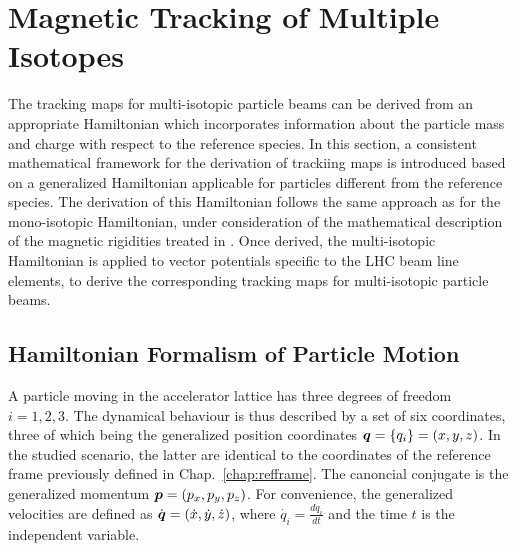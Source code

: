 \section{Magnetic Tracking of Multiple Isotopes}
%
The tracking maps for multi-isotopic particle beams can be derived from an appropriate Hamiltonian which incorporates information about the particle mass and charge with respect to the reference species. In this section, a consistent mathematical framework for the derivation of trackiing maps is introduced based on a  generalized Hamiltonian applicable for particles different from the reference species. The derivation of this Hamiltonian follows the same approach as for the mono-isotopic Hamiltonian, under consideration of the mathematical description of the magnetic rigidities treated in \chapref{}. Once derived, the multi-isotopic Hamiltonian is applied to vector potentials specific to the LHC beam line elements, to derive the corresponding tracking maps for multi-isotopic particle beams.
%
\subsection{Hamiltonian Formalism of Particle Motion} \label{chap:hamiltonian}


A particle moving in the accelerator lattice has three degrees of freedom $i=1,2,3$. The dynamical behaviour is thus described by a set of six coordinates, three of which being the generalized position coordinates $\boldsymbol{q} = \{q_i\} = (x,y,z)$. In the studied scenario, the latter are identical to the coordinates of the reference frame previously defined in Chap.~\ref{chap:refframe}. The canoncial conjugate is the generalized momentum $\boldsymbol{p} = (p_x,p_y,p_z)$. For convenience, the generalized velocities are defined as $\dot{\boldsymbol{q}} = (\dot{x},\dot{y},\dot{z})$, where $\dot{q_i} = \frac{d q_i}{dt}$ and the time $t$ is the independent variable.

